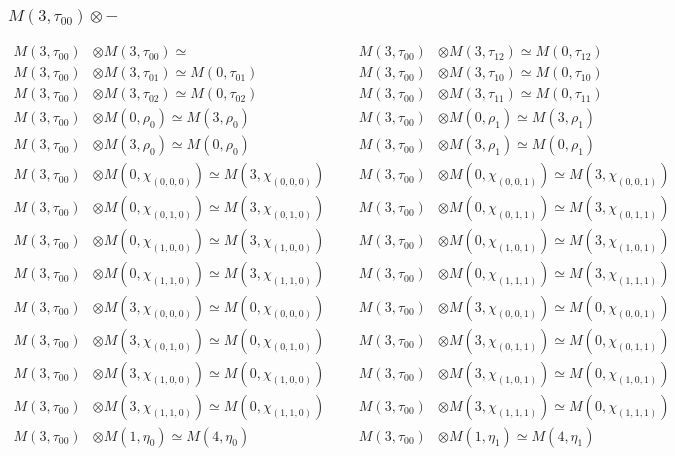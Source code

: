 \subsubsection{$ M(3,\tau_{00})\otimes -$}
\begin{align*}
M(3,\tau_{00}) &\otimes M(3,\tau_{00}) \simeq  &&& M(3,\tau_{00}) &\otimes M(3,\tau_{12}) \simeq M(0,\tau_{12})\\
M(3,\tau_{00}) &\otimes M(3,\tau_{01}) \simeq M(0,\tau_{01}) &&& M(3,\tau_{00}) &\otimes M(3,\tau_{10}) \simeq M(0,\tau_{10})\\
M(3,\tau_{00}) &\otimes M(3,\tau_{02}) \simeq M(0,\tau_{02}) &&& M(3,\tau_{00}) &\otimes M(3,\tau_{11}) \simeq M(0,\tau_{11})\\
M(3,\tau_{00}) &\otimes M(0,\rho_{0}) \simeq M(3,\rho_{0}) &&& M(3,\tau_{00}) &\otimes M(0,\rho_{1}) \simeq M(3,\rho_{1})\\
M(3,\tau_{00}) &\otimes M(3,\rho_{0}) \simeq M(0,\rho_{0}) &&& M(3,\tau_{00}) &\otimes M(3,\rho_{1}) \simeq M(0,\rho_{1})\\
M(3,\tau_{00}) &\otimes M(0,\chi_{(0,0,0)}) \simeq M(3,\chi_{(0,0,0)}) &&& M(3,\tau_{00}) &\otimes M(0,\chi_{(0,0,1)}) \simeq M(3,\chi_{(0,0,1)})\\
M(3,\tau_{00}) &\otimes M(0,\chi_{(0,1,0)}) \simeq M(3,\chi_{(0,1,0)}) &&& M(3,\tau_{00}) &\otimes M(0,\chi_{(0,1,1)}) \simeq M(3,\chi_{(0,1,1)})\\
M(3,\tau_{00}) &\otimes M(0,\chi_{(1,0,0)}) \simeq M(3,\chi_{(1,0,0)}) &&& M(3,\tau_{00}) &\otimes M(0,\chi_{(1,0,1)}) \simeq M(3,\chi_{(1,0,1)})\\
M(3,\tau_{00}) &\otimes M(0,\chi_{(1,1,0)}) \simeq M(3,\chi_{(1,1,0)}) &&& M(3,\tau_{00}) &\otimes M(0,\chi_{(1,1,1)}) \simeq M(3,\chi_{(1,1,1)})\\
M(3,\tau_{00}) &\otimes M(3,\chi_{(0,0,0)}) \simeq M(0,\chi_{(0,0,0)}) &&& M(3,\tau_{00}) &\otimes M(3,\chi_{(0,0,1)}) \simeq M(0,\chi_{(0,0,1)})\\
M(3,\tau_{00}) &\otimes M(3,\chi_{(0,1,0)}) \simeq M(0,\chi_{(0,1,0)}) &&& M(3,\tau_{00}) &\otimes M(3,\chi_{(0,1,1)}) \simeq M(0,\chi_{(0,1,1)})\\
M(3,\tau_{00}) &\otimes M(3,\chi_{(1,0,0)}) \simeq M(0,\chi_{(1,0,0)}) &&& M(3,\tau_{00}) &\otimes M(3,\chi_{(1,0,1)}) \simeq M(0,\chi_{(1,0,1)})\\
M(3,\tau_{00}) &\otimes M(3,\chi_{(1,1,0)}) \simeq M(0,\chi_{(1,1,0)}) &&& M(3,\tau_{00}) &\otimes M(3,\chi_{(1,1,1)}) \simeq M(0,\chi_{(1,1,1)})\\
M(3,\tau_{00}) &\otimes M(1,\eta_{0}) \simeq M(4,\eta_{0}) &&& M(3,\tau_{00}) &\otimes M(1,\eta_{1}) \simeq M(4,\eta_{1})\\

\end{align*}
